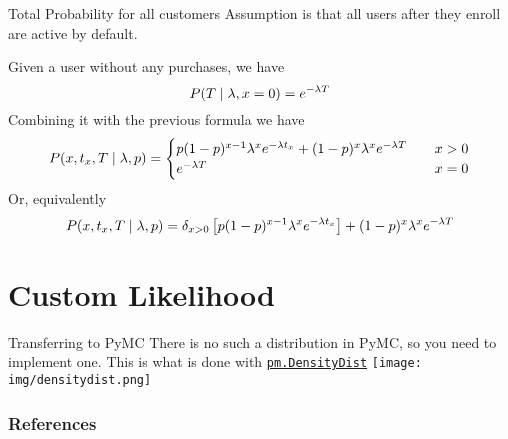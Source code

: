 \documentclass{beamer}
\begin{document}
\begin{frame}{Total Probability for all customers}
Assumption is that all users after they enroll are active by default.

Given a user without any purchases, we have 
\begin{equation*}
    P(T\;|\; \lambda, x=0) = e^{-\lambda T}
\end{equation*}
Combining it with the previous formula we have
\begin{equation*}
    P(x, t_x, T\;|\; \lambda, p) = \begin{cases}
        p (1-p)^{x-1}\lambda^xe^{-\lambda t_x} + (1-p)^{x}\lambda^xe^{-\lambda T}\quad &x>0\\
        e^{-\lambda T}\quad &x=0
    \end{cases}
\end{equation*}
Or, equivalently
\begin{equation*}
    P(x, t_x, T\;|\; \lambda, p) = \delta_{x>0} \left[p (1-p)^{x-1}\lambda^xe^{-\lambda t_x}\right] + (1-p)^{x}\lambda^xe^{-\lambda T}
\end{equation*}
\end{frame}
\section{Custom Likelihood}
\begin{frame}{Transferring to PyMC}
    There is no such a distribution in PyMC, so you need to implement one. This is what is done with \texttt{\href{https://www.pymc.io/projects/docs/en/stable/api/distributions/generated/pymc.DensityDist.html}{pm.DensityDist}}
\texttt{[image: img/densitydist.png]}
\end{frame}
\begin{frame}[allowframebreaks]
\frametitle{References}


\end{frame}
\end{document}
